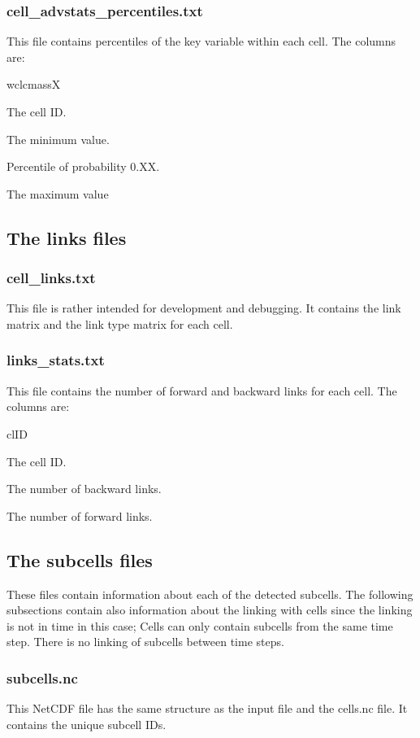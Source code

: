 \documentclass{scrartcl}
\begin{document}
\subsubsection{cell\_advstats\_percentiles.txt}
This file contains percentiles of the key variable within each cell. The columns are:
\begin{labeling}{wclcmassX}
	\item[clID] The cell ID.
	\item[MIN] The minimum value.
	\item[0.XX] Percentile of probability 0.XX.
	\item[MAX] The maximum value
\end{labeling}

\subsection{The links files}
\subsubsection{cell\_links.txt}
This file is rather intended for development and debugging. It contains the link matrix and the link type matrix for each cell.

\subsubsection{links\_stats.txt}
This file contains the number of forward and backward links for each cell. The columns are:
\begin{labeling}{clID}
	\item[clID] The cell ID.
	\item[nbw] The number of backward links.
	\item[nfw] The number of forward links.

\end{labeling}

\subsection{The subcells files}
These files contain information about each of the detected subcells. The following subsections contain also information about the linking with cells since the linking is not in time in this case; Cells can only contain subcells from the same time step. There is no linking of subcells between time steps.

\subsubsection{subcells.nc}
This NetCDF file has the same structure as the input file and the cells.nc file. It contains the unique subcell IDs.
\end{document}
